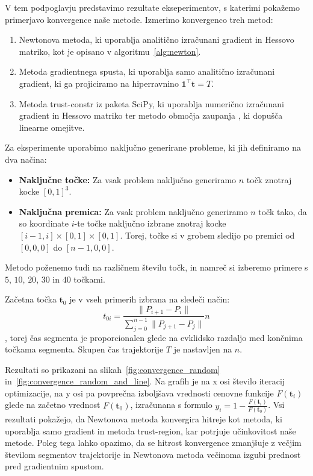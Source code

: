 \documentclass[mat2, tisk]{fmfdelo}
\newcommand{\tvec}{\mathbf{t}}
\begin{document}
V tem podpoglavju predstavimo rezultate ekseperimentov, s katerimi pokažemo primerjavo konvergence naše metode. Izmerimo konvergenco treh metod:
\begin{enumerate}
    \item Newtonova metoda, ki uporablja analitično izračunani gradient in Hessovo matriko, kot je opisano v algoritmu~\ref{alg:newton}.
    \item Metoda gradientnega spusta, ki uporablja samo analitično izračunani gradient, ki ga projiciramo na hiperravnino $\mathbf{1}^\top \mathbf{t} = T$.
    \item Metoda trust-constr iz paketa SciPy, ki uporablja numerično izračunani gradient in Hessovo matriko ter metodo območja zaupanja \cite{conn2000trust}, ki dopušča linearne omejitve.
\end{enumerate}

Za eksperimente uporabimo naključno generirane probleme, ki jih definiramo na dva načina:
\begin{itemize}
    \item \textbf{Naključne točke:} Za vsak problem naključno generiramo $n$ točk znotraj kocke $[0, 1]^3$.
    \item \textbf{Naključna premica:} Za vsak problem naključno generiramo $n$ točk tako, da so koordinate $i$-te točke naključno izbrane znotraj kocke $[i-1, i]\times[0, 1]\times[0, 1]$. Torej, točke si v grobem sledijo po premici od $[0, 0, 0]$ do $[n-1, 0, 0]$.
\end{itemize}
    
Metodo poženemo tudi na različnem številu točk, in namreč si izberemo primere s $5$, $10$, $20$, $30$ in $40$ točkami.

Začetna točka $\tvec_0$ je v vseh primerih izbrana na sledeči način:
\begin{equation}
    t_{0i} = \frac{\|P_{i+1} - P_i\|}{\sum_{j=0}^{n-1} \|P_{j+1} - P_j\|} n
\end{equation},
torej čas segmenta je proporcionalen glede na evklidsko razdaljo med končnima točkama segmenta. Skupen čas trajektorije $T$ je nastavljen na $n$.

 Rezultati so prikazani na slikah~\ref{fig:convergence_random} in~\ref{fig:convergence_random_and_line}. Na grafih je na x osi število iteracij optimizacije, na y osi pa povprečna izboljšava vrednosti cenovne funkcije $F(\tvec_i)$ glede na začetno vrednost $F(\tvec_0)$, izračunana s formulo $y_i = 1 - \frac{F(\tvec_i)}{F(\tvec_0)}$. Vsi rezultati pokažejo, da Newtonova metoda konvergira hitreje kot metoda, ki uporablja samo gradient in metoda trust-region, kar potrjuje učinkovitost naše metode. Poleg tega lahko opazimo, da se hitrost konvergence zmanjšuje z večjim številom segmentov trajektorije in Newtonova metoda večinoma  izgubi prednost pred gradientnim spustom.
\end{document}
